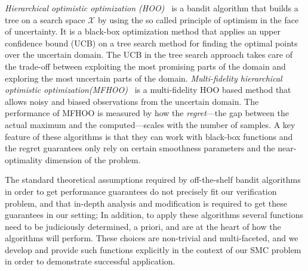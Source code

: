 \documentclass[11pt]{article}
\theoremstyle{definition}
\newcommand{\sayan}[1]{\textcolor{blue}{#1}}
\newcommand{\X}{\mathcal{X}}
\begin{document}
{\em Hierarchical optimistic optimization (HOO)~\cite{Bubeck:2011}} is a bandit algorithm that builds a tree on a search space $\X$ by using the so called principle of optimism in the face of uncertainty. It is a black-box optimization method that applies an upper confidence bound (UCB) on a tree search method for finding the optimal points over the uncertain domain. The UCB in the tree search approach takes care of the trade-off between exploiting the most promising parts of the domain and exploring the most uncertain parts of the domain. {\em Multi-fidelity hierarchical optimistic optimization(MFHOO)}~\cite{sen2019noisy} is a multi-fidelity HOO based method that allows noisy and biased observations from the uncertain domain. The performance of MFHOO is  measured by  how the {\em regret\/}---the gap between the actual maximum and the computed---scales with the number of samples. A key feature of these algorithms is that they can work with black-box functions and the regret guarantees only rely on certain smoothness parameters and the near-optimality dimension of the problem.
%

%
The standard theoretical assumptions required by off-the-shelf bandit algorithms in order to get performance guarantees do not precisely fit our verification problem, and that in-depth analysis and modification is required to get these guarantees in our setting; In addition, to apply these algorithms several functions need to be judiciously determined, a priori, and are at the heart of how the algorithms will perform. These choices are non-trivial and multi-faceted, and we develop and provide such functions explicitly in the context of our SMC problem in order to demonstrate successful application.
%
\end{document}
